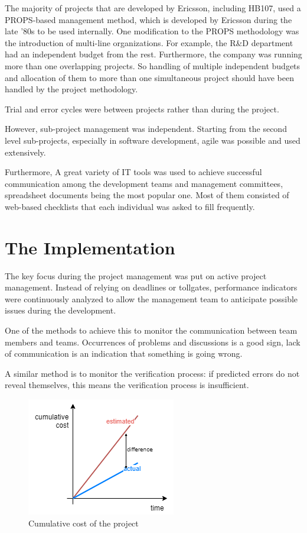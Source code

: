 \documentclass[conference]{IEEEtran}
\begin{document}
The majority of projects that are developed by Ericsson, including HB107, used a PROPS-based management method, which is developed by Ericsson during the late '80s to be used internally. One modification to the PROPS methodology was the introduction of multi-line organizations. For example, the R\&D department had an independent budget from the rest. Furthermore, the company was running more than one overlapping projects. So handling of multiple independent budgets and allocation of them to more than one simultaneous project should have been handled by the project methodology. 

Trial and error cycles were between projects rather than during the project.

However, sub-project management was independent. Starting from the second level sub-projects, especially in software development, agile was possible and used extensively.



Furthermore, A great variety of IT tools was used to achieve successful communication among the development teams and management committees, spreadsheet documents being the most popular one. Most of them consisted of web-based checklists that each individual was asked to fill frequently.

\section{The Implementation}
The key focus during the project management was put on active project management. Instead of relying on deadlines or tollgates, performance indicators were continuously analyzed to allow the management team to anticipate possible issues during the development. 

One of the methods to achieve this to monitor the communication between team members and teams. Occurrences of problems and discussions is a good sign, lack of communication is an indication that something is going wrong. 

A similar method is to monitor the verification process: if predicted errors do not reveal themselves, this means the verification process is insufficient. 

\begin{figure}[h]
    \centering
    \includegraphics[width=0.8\linewidth]{cost.png}
    \caption{Cumulative cost of the project}
    \label{fig:cost}
\end{figure}
\end{document}
